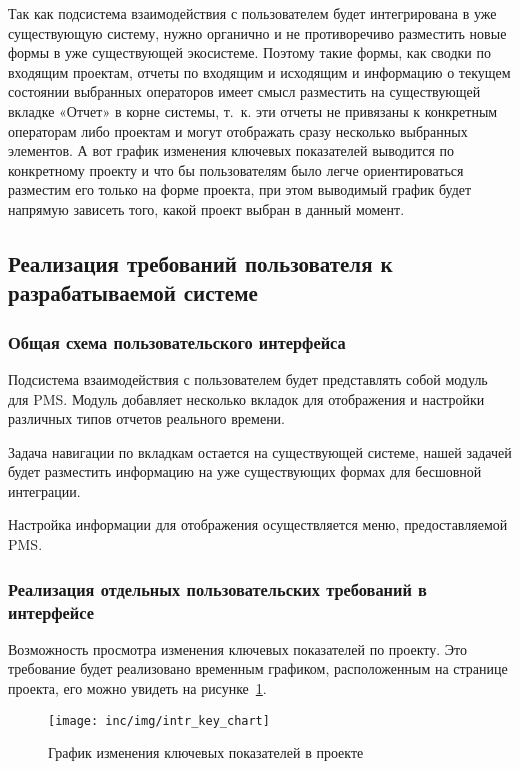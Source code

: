 Так как подсистема взаимодействия с пользователем %
будет интегрирована в уже существующую систему,
нужно органично и не противоречиво разместить новые формы в уже существующей экосистеме.
Поэтому такие формы, как сводки по входящим проектам,
отчеты по входящим и исходящим
и информацию о текущем состоянии выбранных операторов имеет смысл разместить на существующей вкладке
«Отчет» в корне системы,
т.~к. эти отчеты не привязаны к конкретным операторам либо проектам и могут
отображать сразу несколько выбранных элементов.
А вот график изменения ключевых
показателей выводится по конкретному проекту и что бы пользователям было легче
ориентироваться разместим его только на форме проекта,
при этом выводимый график будет напрямую зависеть того,
какой проект выбран в данный момент.

\subsection{Реализация требований пользователя к разрабатываемой системе}

\subsubsection{Общая схема пользовательского интерфейса}

Подсистема взаимодействия с пользователем %
будет представлять собой модуль для PMS.
Модуль добавляет несколько вкладок для отображения и настройки различных
типов отчетов реального времени.

Задача навигации по вкладкам остается на существующей системе,
нашей задачей будет разместить информацию на уже существующих формах для бесшовной интеграции.

Настройка информации для отображения осуществляется меню, предоставляемой PMS\@.

\subsubsection{Реализация отдельных пользовательских требований в интерфейсе}

Возможность просмотра изменения ключевых показателей по проекту.
Это требование будет реализовано временным графиком, расположенным на странице проекта, его можно увидеть на рисунке~\ref{pic:intr:proj:keyval}.

\begin{figure}[ht]
    \centering
    \texttt{[image: inc/img/intr\_key\_chart]}
    \caption{График изменения ключевых показателей в проекте}
    \label{pic:intr:proj:keyval}
\end{figure}

